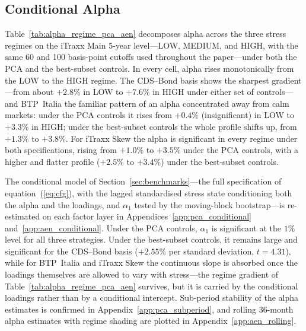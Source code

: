 
\subsection{Conditional Alpha}
\label{sec:conditional_alpha}

Table~\ref{tab:alpha_regime_pca_aen} decomposes alpha across the three
stress regimes on the iTraxx Main 5-year level---LOW, MEDIUM, and
HIGH, with the same 60 and 100 basis-point cutoffs used throughout the
paper---under both the PCA and the best-subset controls. In every
cell, alpha rises monotonically from the LOW to the HIGH regime. The
CDS--Bond basis shows the sharpest gradient---from about $+2.8\%$ in
LOW to $+7.6\%$ in HIGH under either set of controls---and BTP~Italia the
familiar pattern of an alpha concentrated away from calm markets:
under the PCA controls it rises from $+0.4\%$ (insignificant) in LOW
to $+3.3\%$ in HIGH; under the best-subset controls the whole
profile shifts up, from $+1.3\%$ to $+3.8\%$. For iTraxx Skew
the alpha is significant in every regime under both specifications,
rising from $+1.0\%$ to $+3.5\%$ under the PCA controls, with a
higher and flatter profile ($+2.5\%$ to $+3.4\%$) under the
best-subset controls.

The \citet{christopherson1998conditioning} conditional model of
Section~\ref{sec:benchmarks}---the full specification of
equation~(\ref{eq:cfg}), with the lagged standardised stress state
conditioning both the alpha and the loadings, and $\alpha_1$ tested by
the moving-block bootstrap---is re-estimated on each factor layer in
Appendices~\ref{app:pca_conditional} and~\ref{app:aen_conditional}.
Under the PCA controls, $\alpha_1$ is significant at the $1\%$ level
for all three strategies. Under the best-subset controls, it remains
large and significant for the CDS--Bond basis ($+2.55\%$ per standard
deviation, $t = 4.31$), while for BTP~Italia and iTraxx Skew the
continuous slope is absorbed once the loadings themselves are allowed
to vary with stress---the regime gradient of
Table~\ref{tab:alpha_regime_pca_aen} survives, but it is carried by
the conditional loadings rather than by a conditional intercept.
Sub-period stability of the alpha estimates is confirmed in
Appendix~\ref{app:pca_subperiod}, and rolling 36-month alpha estimates
with regime shading are plotted in Appendix~\ref{app:aen_rolling}.



